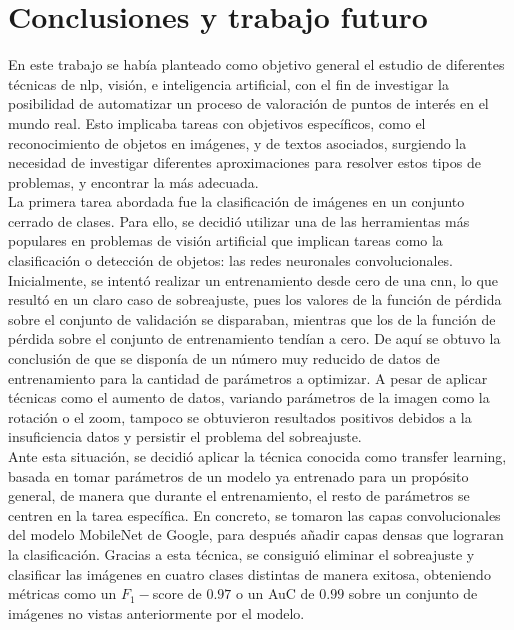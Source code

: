 \chapter{Conclusiones y trabajo futuro}

	En este trabajo se había planteado como objetivo general el estudio de diferentes técnicas de \gls{nlp}, visión, e inteligencia artificial, con el fin de investigar la posibilidad de automatizar un proceso de valoración de puntos de interés en el mundo real. Esto implicaba tareas con objetivos específicos, como el reconocimiento de objetos en imágenes, y de textos asociados, surgiendo la necesidad de investigar diferentes aproximaciones para resolver estos tipos de problemas, y encontrar la más adecuada. \\
	
	La primera tarea abordada fue la clasificación de imágenes en un conjunto cerrado de clases. Para ello, se decidió utilizar una de las herramientas más populares en problemas de visión artificial que implican tareas como la clasificación o detección de objetos: las redes neuronales convolucionales. Inicialmente, se intentó realizar un entrenamiento desde cero de una \gls{cnn}, lo que resultó en un claro caso de sobreajuste, pues los valores de la función de pérdida sobre el conjunto de validación se disparaban, mientras que los de la función de pérdida sobre el conjunto de entrenamiento tendían a cero. De aquí se obtuvo la conclusión de que se disponía de un número muy reducido de datos de entrenamiento para la cantidad de parámetros a optimizar. A pesar de aplicar técnicas como el aumento de datos, variando parámetros de la imagen como la rotación o el zoom, tampoco se obtuvieron resultados positivos debidos a la insuficiencia datos y persistir el problema del sobreajuste. \\
	
	Ante esta situación, se decidió aplicar la técnica conocida como transfer learning, basada en tomar parámetros de un modelo ya entrenado para un propósito general, de manera que durante el entrenamiento, el resto de parámetros se centren en la tarea específica. En concreto, se tomaron las capas convolucionales del modelo MobileNet de Google, para después añadir capas densas que lograran la clasificación. Gracias a esta técnica, se consiguió eliminar el sobreajuste y clasificar las imágenes en cuatro clases distintas de manera exitosa, obteniendo métricas como un $F_1-$score de $0.97$ o un AuC de $0.99$ sobre un conjunto de imágenes no vistas anteriormente por el modelo. \\
	
